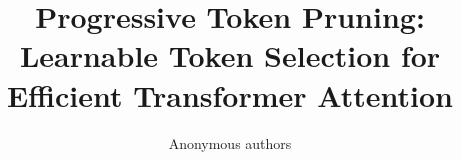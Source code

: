 \title{\textbf{Progressive Token Pruning: Learnable Token Selection for Efficient Transformer Attention}}

\author{Anonymous authors}
